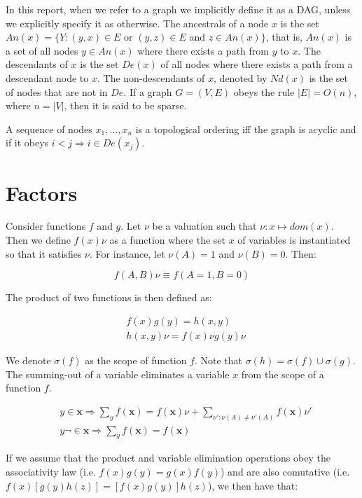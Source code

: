 \documentclass{amsart}
\theoremstyle{plain}
\renewcommand{\implies}{\Rightarrow}
\begin{document}
In this report, when we refer to a graph we implicitly define it as a DAG, unless we explicitly
specify it as otherwise. The ancestrals of a node $x$ is the set $An(x)=\{Y:(y,x)\in E$ or $(y,z)
\in E$ and $z\in An(x)\}$, that is, $An(x)$ is a set of all nodes $y\in An(x)$ where there exists a
path from $y$ to $x$. The descendants of $x$ is the set $De(x)$ of all nodes where there exists a
path from a descendant node to $x$. The non-descendants of $x$, denoted by $Nd(x)$ is the set of
nodes that are not in $De$. If a graph $G=(V,E)$ obeys the rule $|E|=O(n)$, where $n=|V|$, then it
is said to be sparse.

A sequence of nodes $x_1,\ldots,x_n$ is a topological ordering iff the graph is acyclic and if it
obeys $i<j \implies i\in De(x_j)$.

\section{Factors}

Consider functions $f$ and $g$. Let $\nu$ be a valuation such that $\nu : x\mapsto dom(x)$. Then we
define $f(x)\nu$ as a function where the set $x$ of variables is instantiated so that it satisfies
$\nu$. For instance, let $\nu(A)=1$ and $\nu(B)=0$. Then:


\begin{equation*}
  f(A,B)\nu \equiv f(A=1,B=0)
\end{equation*}

The product of two functions is then defined as:

\begin{align*}
  &f(x)g(y)=h(x,y)\\
  &h(x,y)\nu=f(x)\nu g(y)\nu
\end{align*}

We denote $\sigma(f)$ as the scope of function $f$. Note that $\sigma(h)=\sigma(f)\cup\sigma(g)$.
The summing-out of a variable eliminates a variable $x$ from the scope of a function $f$.

\begin{align*}
  &y \in \mathbf{x} \implies \sum_y f(\mathbf{x}) = f(\mathbf{x})\nu + \sum_{\nu':\nu(A)\neq
  \nu'(A)} f(\mathbf{x})\nu'\\
  &y \neg\in \mathbf{x} \implies \sum_y f(\mathbf{x}) = f(\mathbf{x})
\end{align*}

If we assume that the product and variable elimination operations obey the associativity law (i.e.
$f(x)g(y)=g(x)f(y)$) and are also comutative (i.e. $f(x)[g(y)h(z)]=[f(x)g(y)]h(z)$), we then have
that:
\end{document}
